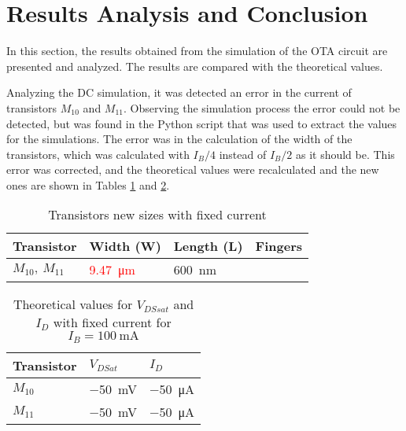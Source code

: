 \section{Results Analysis and Conclusion}

In this section, the results obtained from the simulation of the OTA circuit are presented and analyzed. The results are compared with the theoretical values.

Analyzing the DC simulation, it was detected an error in the current of transistors $M_{10}$ and $M_{11}$. Observing the simulation process the error could not be detected, but was found in the Python script that was used to extract the values for the simulations. The error was in the calculation of the width of the transistors, which was calculated with $I_B/4$ instead of $I_B/2$ as it should be. This error was corrected, and the theoretical values were recalculated and the new ones are shown in Tables \ref{tab:WL-teo-fix} and \ref{tab:sizes corrected}.

\begin{table}[H]
    \centering
    \caption{Transistors new sizes with fixed current}
    \begin{tabularx}{\textwidth}{>{\centering\arraybackslash}X >{\centering\arraybackslash}X >{\centering\arraybackslash} X >{\centering\arraybackslash}X}
        \toprule
        \textbf{Transistor} & \textbf{Width (W)} & \textbf{Length (L)} & \textbf{Fingers}\\
        \midrule
        $M_{10}, \ M_{11}$ & \textcolor{red}{\SI{9.47}{\micro\meter} } & \SI{600}{\nano\meter} & 18\\
        \bottomrule
    \end{tabularx}
    \label{tab:WL-teo-fix}
\end{table}

\begin{table}[H]
    \centering
    \caption{Theoretical values for $V_{DSsat}$ and $I_D$ with fixed current for $I_B = \SI{100}{\milli\ampere}$ }
    \begin{tabularx}{\textwidth}{>{\centering\arraybackslash}X >{\centering\arraybackslash}X >{\centering\arraybackslash}X}
        \toprule
        \textbf{Transistor} & \textbf{$V_{DSat}$} & \textbf{$I_D$}\\
        \midrule
        $M_{10}$ & \SI{-50}{\milli\volt} & \SI{-50}{\micro\ampere}\\
        \midrule
        $M_{11}$ & \SI{-50}{\milli\volt} & \SI{-50}{\micro\ampere}\\
        \bottomrule
    \end{tabularx}
    \label{tab:sizes corrected}
\end{table}

